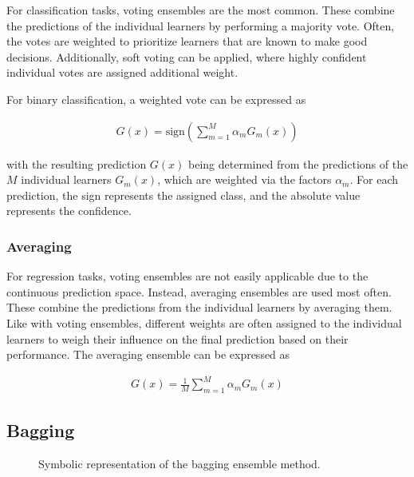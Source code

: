 For classification tasks, voting ensembles are the most common. These combine the predictions of the individual learners by performing a majority vote. Often, the votes are weighted to prioritize learners that are known to make good decisions. Additionally, soft voting can be applied, where highly confident individual votes are assigned additional weight.

For binary classification, a weighted vote can be expressed as

\begin{align}
    G(x) = \mathrm{sign}\!\left(\sum^{M}_{m=1}\alpha_m G_m(x)\right)
    \label{eq:voting}
\end{align}

\noindent with the resulting prediction $G(x)$ being determined from the predictions of the $M$ individual learners $G_m(x)$, which are weighted via the factors $\alpha_m$. For each prediction, the sign represents the assigned class, and the absolute value represents the confidence.

\subsubsection{Averaging}
For regression tasks, voting ensembles are not easily applicable due to the continuous prediction space. Instead, averaging ensembles are used most often. These combine the predictions from the individual learners by averaging them. Like with voting ensembles, different weights are often assigned to the individual learners to weigh their influence on the final prediction based on their performance. The averaging ensemble can be expressed as

\begin{align}
    G(x) = \frac{1}{M} \sum^{M}_{m=1}\alpha_m G_m(x)
    \label{eq:averaging}
\end{align}

\subsection{Bagging} \label{Bagging}

\begin{figure}[htbp]
    \centering
    
    \caption{Symbolic representation of the bagging ensemble method.\footnotemark }
    \label{fig:bagging}
\end{figure}

